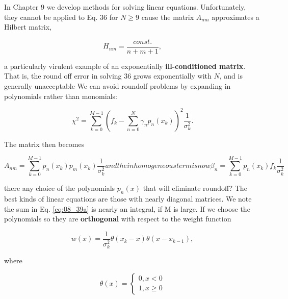 In Chapter 9 we develop methods for solving linear equations. Unfortunately, they cannot be applied to Eq. 36 for $N \geq 9$ cause the matrix $A_{nm}$ approximates a Hilbert matrix,

\begin{equation}
H_{nm} = \frac{const.}{n+m+1} ,
\end{equation}

a particularly virulent example of an exponentially \textbf{ill-conditioned matrix}. That is, the round off error in solving 36 grows exponentially with $N$, and is generally unacceptable We can avoid roundolf problems by expanding in polynomials rather than monomials:

\begin{equation}\label{eq:08_38}
\chi^{2} = \sum_{k=0}^{M-1} (f_{k} - \sum_{n=0}^{N} \gamma_{n}p_{n}(x_{k}) )^2 \frac{1}{\sigma_{k}^{2}} .
\end{equation}

The matrix then becomes

\begin{subequations}
    \begin{equation}
    A_{nm} = \sum_{k=0}^{M-1} p_{n}(x_{k})p_{m}(x_{k}) \frac{1}{\sigma_{k}^{2}}
    \end{equation}
and the inhomogeneous term is now
    \begin{equation}
    \beta_{n} = \sum_{k=0}^{M-1} p_{n}(x_{k})f_{k} \frac{1}{\sigma_{k}^{2}}
    \end{equation}
    \label{eq:08_39a}
\end{subequations}

 there any choice of the polynomials $p_{n}(x)$ that will eliminate roundoff? The best kinds of linear equations are those with nearly diagonal matrices. We note the sum in Eq. \ref{eq:08_39a} is nearly an integral, if M is large. If we choose the polynomials so they are \textbf{orthogonal} with respect to the weight function

\begin{equation*}
w(x) = \frac{1}{\sigma_{k}^{2}} \theta(x_{k} - x ) \theta(x - x_{k-1}),
\end{equation*}

where

\begin{equation*}
\theta(x) =
    \begin{cases}
        0, x < 0 \\
        1, x \geq 0
    \end{cases}
\end{equation*}

